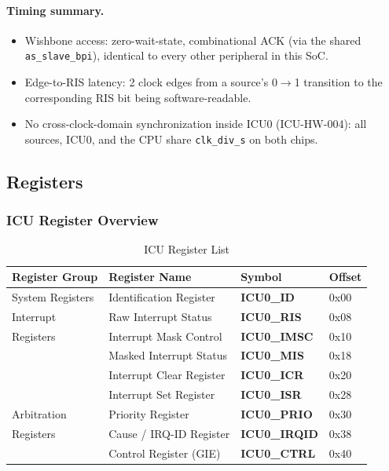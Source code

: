 \paragraph{Timing summary.}
\begin{itemize}
  \item Wishbone access: zero-wait-state, combinational ACK (via the
    shared \texttt{as\_slave\_bpi}), identical to every other peripheral
    in this SoC.
  \item Edge-to-RIS latency: 2 clock edges from a source's 0$\to$1
    transition to the corresponding RIS bit being software-readable.
  \item No cross-clock-domain synchronization inside ICU0 (ICU-HW-004):
    all sources, ICU0, and the CPU share \texttt{clk\_div\_s} on both
    chips.
\end{itemize}

\subsection{Registers}

\subsubsection{ICU Register Overview}

\begin{table}[H]
\caption{ICU Register List}
\label{tab:asIcuRegList}
\centering
\begin{tabularx}{\textwidth}{|l |X |l |l|}
  \hline
  Register Group & Register Name & Symbol & Offset \\
  \hline
  \hline
  System Registers  & Identification Register       & \textbf{ICU0\_ID}    & 0x00 \\
  \hline
  Interrupt         & Raw Interrupt Status          & \textbf{ICU0\_RIS}   & 0x08 \\
  Registers         & Interrupt Mask Control        & \textbf{ICU0\_IMSC}  & 0x10 \\
                    & Masked Interrupt Status       & \textbf{ICU0\_MIS}   & 0x18 \\
                    & Interrupt Clear Register      & \textbf{ICU0\_ICR}   & 0x20 \\
                    & Interrupt Set Register        & \textbf{ICU0\_ISR}   & 0x28 \\
  \hline
  Arbitration       & Priority Register             & \textbf{ICU0\_PRIO}  & 0x30 \\
  Registers         & Cause / IRQ-ID Register       & \textbf{ICU0\_IRQID} & 0x38 \\
                    & Control Register (GIE)        & \textbf{ICU0\_CTRL}  & 0x40 \\
  \hline
\end{tabularx}
\end{table}

